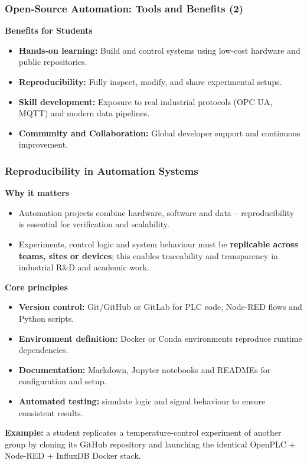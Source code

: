 \begin{frame}
	\frametitle{Open-Source Automation: Tools and Benefits (2)}
  \vspace{2mm}
  \textbf{Benefits for Students}
  \begin{itemize}
      \item \textbf{Hands-on learning:} Build and control systems using low-cost hardware and public repositories.
      \item \textbf{Reproducibility:} Fully inspect, modify, and share experimental setups.
      \item \textbf{Skill development:} Exposure to real industrial protocols (OPC UA, MQTT) and modern data pipelines.
      \item \textbf{Community and Collaboration:} Global developer support and continuous improvement.
  \end{itemize}
\end{frame}
\begin{frame}
	\frametitle{Reproducibility in Automation Systems}
	\small
	\textbf{Why it matters}
	\begin{itemize}
		\item Automation projects combine hardware, software and data -- reproducibility is essential for verification and scalability.
		\item Experiments, control logic and system behaviour must be \textbf{replicable across teams, sites or devices}; this enables traceability and transparency in industrial R\&D and academic work.
	\end{itemize}
	\textbf{Core principles}
	\begin{itemize}
		\item \textbf{Version control:} Git/GitHub or GitLab for PLC code, Node-RED flows and Python scripts.
		\item \textbf{Environment definition:} Docker or Conda environments reproduce runtime dependencies.
		\item \textbf{Documentation:} Markdown, Jupyter notebooks and READMEs for configuration and setup.
		\item \textbf{Automated testing:} simulate logic and signal behaviour to ensure consistent results.
	\end{itemize}
	\textbf{Example:} a student replicates a temperature-control experiment of another group by cloning its GitHub repository and launching the identical OpenPLC + Node-RED + InfluxDB Docker stack.
\end{frame}
